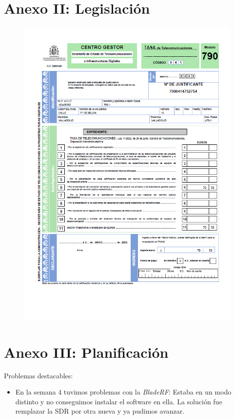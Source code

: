 \documentclass[10pt,a4paper,titlepage]{report}
\begin{document}
\chapter{Anexo II: Legislación}
  	\begin{figure}[H]
	\centering
	\includegraphics[width=\textwidth]{Text/Anexos/Legislacion/solicitud.png}
	\label{solicitud}
	\end{figure}
	
	
	
		
\chapter{Anexo III: Planificación}
	Problemas destacables:
	\begin{itemize}
	\item En la semana 4 tuvimos problemas con la \textit{BladeRF}: Estaba en un modo distinto y no conseguimos instalar el software en ella. La solución fue remplazar la SDR por otra nueva y ya pudimos avanzar.
	\end{itemize}
	
	



\end{document}
